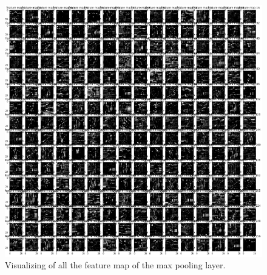 \begin{figure}[ht]
\centering
\includegraphics[angle=90,origin=c,width=1\columnwidth]{Figures/maxpoolingFeaturemap.PNG}
\decoRule
\caption[Visualizing of all the feature map of the max pooling layer.]{ Visualizing of all the feature map of the max pooling layer.}
\label{fig:accuracycomparison2}
\end{figure}




	


	
